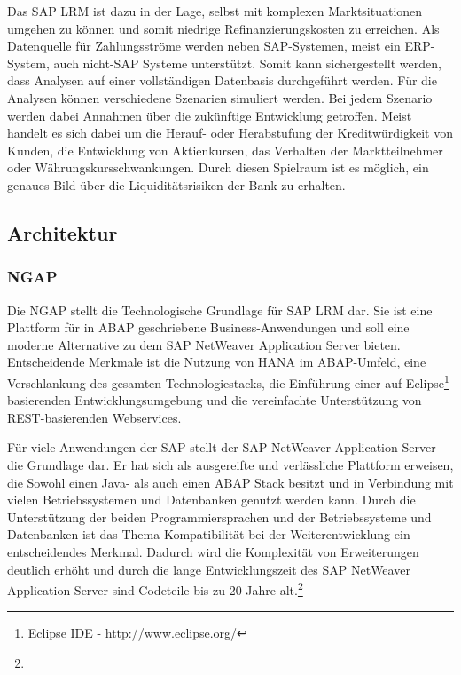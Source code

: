 Das SAP LRM ist dazu in der Lage, selbst mit komplexen Marktsituationen umgehen zu können und somit niedrige Refinanzierungskosten zu erreichen. Als Datenquelle für Zahlungsströme werden neben SAP-Systemen, meist ein \gls{ERP}-System, auch nicht-SAP Systeme unterstützt. Somit kann sichergestellt werden, dass Analysen auf einer vollständigen Datenbasis durchgeführt werden. Für die Analysen können verschiedene Szenarien simuliert werden. Bei jedem Szenario werden dabei Annahmen über die zukünftige Entwicklung getroffen. Meist handelt es sich dabei um die Herauf- oder Herabstufung der Kreditwürdigkeit von Kunden, die Entwicklung von Aktienkursen, das Verhalten der Marktteilnehmer oder Währungskursschwankungen. Durch diesen Spielraum ist es möglich, ein genaues Bild über die Liquiditätsrisiken der Bank zu erhalten.


\subsection{Architektur}


\subsubsection{NGAP}
Die \gls{NGAP} stellt die Technologische Grundlage für SAP LRM dar. Sie ist eine Plattform für in ABAP geschriebene Business-Anwendungen und soll eine moderne Alternative zu dem SAP NetWeaver Application Server bieten. Entscheidende Merkmale ist die Nutzung von \gls{HANA} im ABAP-Umfeld, eine Verschlankung des gesamten Technologiestacks, die Einführung einer auf Eclipse\footnote{Eclipse IDE - http://www.eclipse.org/} basierenden Entwicklungsumgebung und die vereinfachte Unterstützung von REST-basierenden Webservices.

Für viele Anwendungen der SAP stellt der SAP NetWeaver Application Server die Grundlage dar. Er hat sich als ausgereifte und verlässliche Plattform erweisen, die Sowohl einen Java- als auch einen ABAP Stack besitzt und in Verbindung mit vielen Betriebssystemen und Datenbanken genutzt werden kann. Durch die Unterstützung der beiden Programmiersprachen und der Betriebssysteme und Datenbanken ist das Thema Kompatibilität bei der Weiterentwicklung ein entscheidendes Merkmal. Dadurch wird die Komplexität von Erweiterungen deutlich erhöht und durch die lange Entwicklungszeit des SAP NetWeaver Application Server sind Codeteile bis zu 20 Jahre alt.\footnote{ }

